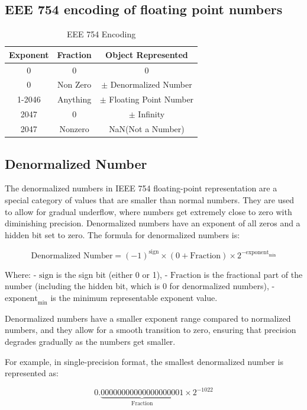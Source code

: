 \documentclass[12pt]{article}
\begin{document}
\subsection{EEE 754 encoding of floating point numbers}
\begin{table}[h]
	\centering
	\begin{tabular}{|c|c|c|}
		\hline
		Exponent & Fraction & Object Represented \\
		\hline
		0 & 0 & 0 \\
		\hline
		0 & Non Zero & $\pm$ Denormalized Number \\
		\hline
		1-2046 & Anything & $\pm$ Floating Point Number \\
		\hline
		2047 & 0 & $\pm$ Infinity \\
		\hline
		2047 & Nonzero & NaN(Not a Number)\\
		\hline
	\end{tabular}
	\caption{EEE 754 Encoding}
	\label{EEE 754 Encoding}
\end{table}

\newpage

\subsection{Denormalized Number}
The denormalized numbers in IEEE 754 floating-point representation are a special category of values that are smaller than normal numbers. They are used to allow for gradual underflow, where numbers get extremely close to zero with diminishing precision. Denormalized numbers have an exponent of all zeros and a hidden bit set to zero. The formula for denormalized numbers is:

\[ \text{Denormalized Number} = (-1)^{\text{sign}} \times (0 + \text{Fraction} ) \times 2^{-\text{exponent}_{\text{min}}} \]

Where:
- \(\text{sign}\) is the sign bit (either 0 or 1),
- \(\text{Fraction}\) is the fractional part of the number (including the hidden bit, which is 0 for denormalized numbers),
- \(\text{exponent}_{\text{min}}\) is the minimum representable exponent value.

Denormalized numbers have a smaller exponent range compared to normalized numbers, and they allow for a smooth transition to zero, ensuring that precision degrades gradually as the numbers get smaller.

For example, in single-precision format, the smallest denormalized number is represented as:

\[ 0.\underbrace{0000 0000 0000 0000 0001}_{\text{Fraction}} \times 2^{-1022} \]
\end{document}
